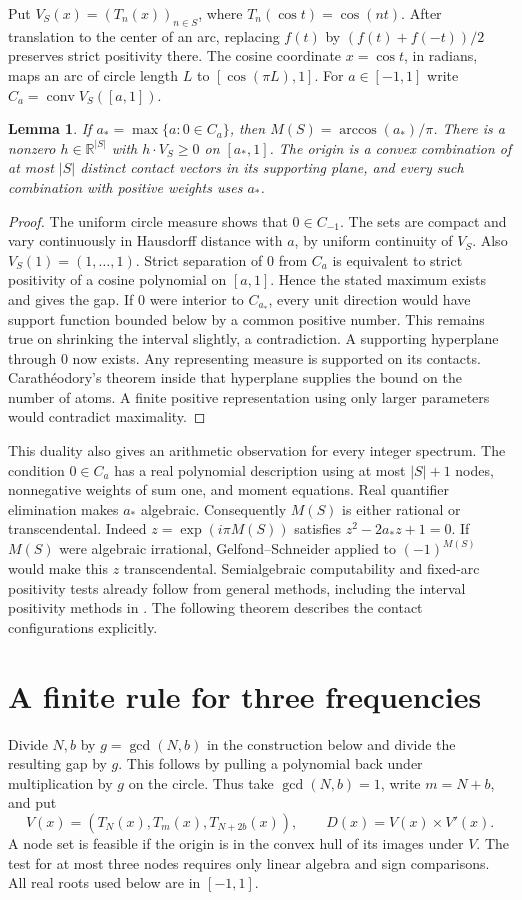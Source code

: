 \documentclass[10pt]{article}
\newtheorem{lemma}[theorem]{Lemma}
\newcommand{\R}{\mathbb R}
\newcommand{\conv}{\operatorname{conv}}
\begin{document}
Put $V_S(x)=(T_n(x))_{n\in S}$, where $T_n(\cos t)=\cos(nt)$. After translation to the center of an arc, replacing $f(t)$ by $(f(t)+f(-t))/2$ preserves strict positivity there. The cosine coordinate $x=\cos t$, in radians, maps an arc of circle length $L$ to $[\cos(\pi L),1]$. For $a\in[-1,1]$ write $C_a=\conv V_S([a,1])$.
\begin{lemma}\label{dual}
If $a_*=\max\{a:0\in C_a\}$, then $M(S)=\arccos(a_*)/\pi$. There is a nonzero $h\in\R^{|S|}$ with $h\cdot V_S\ge0$ on $[a_*,1]$. The origin is a convex combination of at most $|S|$ distinct contact vectors in its supporting plane, and every such combination with positive weights uses $a_*$.
\end{lemma}
\begin{proof}
The uniform circle measure shows that $0\in C_{-1}$. The sets are compact and vary continuously in Hausdorff distance with $a$, by uniform continuity of $V_S$. Also $V_S(1)=(1,\ldots,1)$. Strict separation of $0$ from $C_a$ is equivalent to strict positivity of a cosine polynomial on $[a,1]$. Hence the stated maximum exists and gives the gap. If $0$ were interior to $C_{a_*}$, every unit direction would have support function bounded below by a common positive number. This remains true on shrinking the interval slightly, a contradiction. A supporting hyperplane through $0$ now exists. Any representing measure is supported on its contacts. Carath\'eodory's theorem inside that hyperplane supplies the bound on the number of atoms. A finite positive representation using only larger parameters would contradict maximality.
\end{proof}

This duality also gives an arithmetic observation for every integer spectrum. The condition $0\in C_a$ has a real polynomial description using at most $|S|+1$ nodes, nonnegative weights of sum one, and moment equations. Real quantifier elimination makes $a_*$ algebraic. Consequently $M(S)$ is either rational or transcendental. Indeed $z=\exp(i\pi M(S))$ satisfies $z^2-2a_*z+1=0$. If $M(S)$ were algebraic irrational, Gelfond--Schneider applied to $(-1)^{M(S)}$ would make this $z$ transcendental. Semialgebraic computability and fixed-arc positivity tests already follow from general methods, including the interval positivity methods in \cite{Dum}. The following theorem describes the contact configurations explicitly.

\section{A finite rule for three frequencies}
Divide $N,b$ by $g=\gcd(N,b)$ in the construction below and divide the resulting gap by $g$. This follows by pulling a polynomial back under multiplication by $g$ on the circle. Thus take $\gcd(N,b)=1$, write $m=N+b$, and put
\[
 V(x)=(T_N(x),T_m(x),T_{N+2b}(x)),\qquad D(x)=V(x)\times V'(x).
\]
A node set is feasible if the origin is in the convex hull of its images under $V$. The test for at most three nodes requires only linear algebra and sign comparisons. All real roots used below are in $[-1,1]$.
\end{document}
